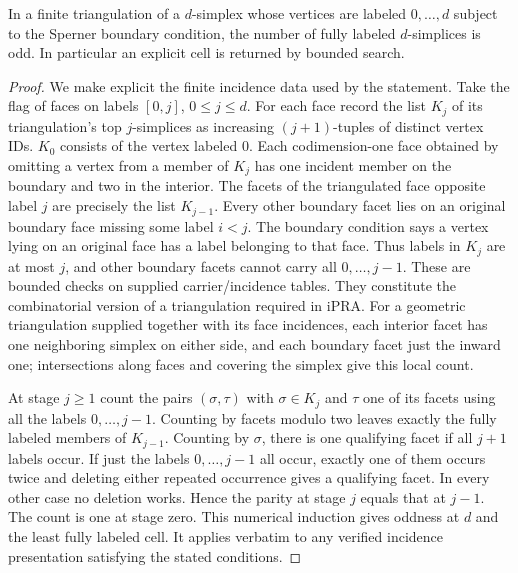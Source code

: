 \begin{theorem}\label{result72}
In a finite triangulation of a $d$-simplex whose vertices are labeled $0,\ldots,d$ subject to the Sperner boundary condition, the number of fully labeled $d$-simplices is odd. In particular an explicit cell is returned by bounded search.
\end{theorem}
\begin{proof}
We make explicit the finite incidence data used by the statement. Take the flag of faces on labels $[0,j]$, $0\le j\le d$. For each face record the list $K_j$ of its triangulation's top $j$-simplices as increasing $(j+1)$-tuples of distinct vertex IDs. $K_0$ consists of the vertex labeled $0$. Each codimension-one face obtained by omitting a vertex from a member of $K_j$ has one incident member on the boundary and two in the interior. The facets of the triangulated face opposite label $j$ are precisely the list $K_{j-1}$. Every other boundary facet lies on an original boundary face missing some label $i<j$. The boundary condition says a vertex lying on an original face has a label belonging to that face. Thus labels in $K_j$ are at most $j$, and other boundary facets cannot carry all $0,\ldots,j-1$. These are bounded checks on supplied carrier/incidence tables. They constitute the combinatorial version of a triangulation required in iPRA. For a geometric triangulation supplied together with its face incidences, each interior facet has one neighboring simplex on either side, and each boundary facet just the inward one; intersections along faces and covering the simplex give this local count.

At stage $j\ge1$ count the pairs $(\sigma,\tau)$ with $\sigma\in K_j$ and $\tau$ one of its facets using all the labels $0,\ldots,j-1$. Counting by facets modulo two leaves exactly the fully labeled members of $K_{j-1}$. Counting by $\sigma$, there is one qualifying facet if all $j+1$ labels occur. If just the labels $0,\ldots,j-1$ all occur, exactly one of them occurs twice and deleting either repeated occurrence gives a qualifying facet. In every other case no deletion works. Hence the parity at stage $j$ equals that at $j-1$. The count is one at stage zero. This numerical induction gives oddness at $d$ and the least fully labeled cell. It applies verbatim to any verified incidence presentation satisfying the stated conditions.
\end{proof}

